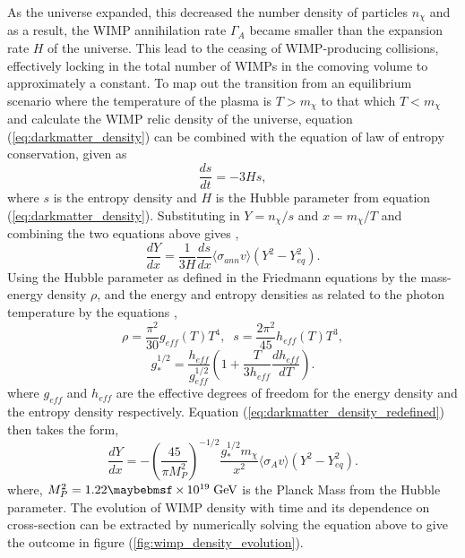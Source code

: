 As the universe expanded, this decreased the number density of particles $n_{\chi}$ and as a result, the WIMP annihilation rate $\Gamma_{A}$ became smaller than the expansion rate $H$ of the universe. This lead to the ceasing of WIMP-producing collisions, effectively locking in the total number of WIMPs in the comoving volume to approximately a constant. To map out the transition from an equilibrium scenario where the temperature of the plasma is $T > m_{\chi}$ to that which $T < m_{\chi}$ and calculate the WIMP relic density of the universe, equation (\ref{eq:darkmatter_density}) can be combined with the equation of law of entropy conservation, given as \cite{Bertone_book}
%
\begin{equation} \label{eq:darkmatter_entropy}
    \frac{ds}{dt} = -3Hs, 
\end{equation}
%
where $s$ is the entropy density and $H$ is the Hubble parameter from equation (\ref{eq:darkmatter_density}). Substituting in $Y = n_{\chi}/s$ and $x = m_{\chi}/T$ and combining the two equations above gives \cite{Bertone_book}, 
%
\begin{equation} \label{eq:darkmatter_density_redefined}
    \frac{dY}{dx} = \frac{1}{3H}\frac{ds}{dx}\langle \sigma_{ann}v \rangle (Y^2 - Y^2_{eq}). 
\end{equation}
%
Using the Hubble parameter as defined in the Friedmann equations by the mass-energy density $\rho$, and the energy and entropy densities as related to the photon temperature by the equations \cite{Bertone_book}, 
%
\begin{equation} \label{eq:g_h_effective}
    \rho = \frac{\pi{}^2}{30}g_{eff}(T)T^4, \; \; s = \frac{2\pi{}^2}{45}h_{eff}(T)T^3,
\end{equation}
%
%
\begin{equation} \label{eq:g_h_effective}
    g^{1/2}_{\ast} = \frac{h_{eff}}{g^{1/2}_{eff}} \left(1 + \frac{T}{3h_{eff}} \frac{dh_{eff}}{dT} \right). 
\end{equation}
%
where $g_{eff}$ and $h_{eff}$ are the effective degrees of freedom for the energy density and the entropy density respectively. Equation (\ref{eq:darkmatter_density_redefined}) then takes the form,
%
\begin{equation} \label{eq:darkmatter_density_redefined}
    \frac{dY}{dx} = -\left(\frac{45}{\pi{}M^{2}_{P}} \right)^{-1/2}\frac{g_{\ast}^{1/2}m_{\chi}}{x^2}\langle \sigma_{A}v \rangle (Y^2 - Y^2_{eq}). 
\end{equation}
%
where, $M^{2}_{P} = 1.22 \times 10^{19} \; \MathText{GeV}$ is the Planck Mass from the Hubble parameter. The evolution of WIMP density with time and its dependence on cross-section can be extracted by numerically solving the equation above to give the outcome in figure (\ref{fig:wimp_density_evolution}). 


